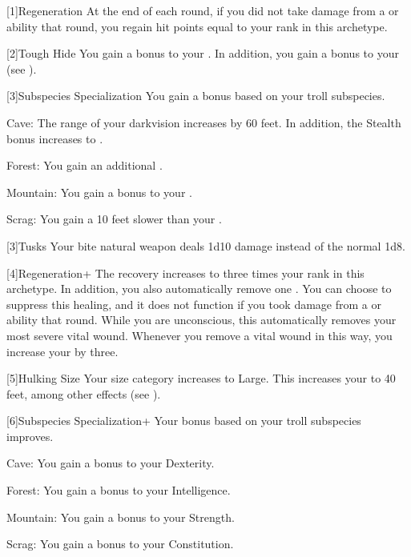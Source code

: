    [1]{Regeneration} At the end of each round, if you did not take damage from a \atAcid or \atFire ability that round, you regain hit points equal to your rank in this archetype.

    [2]{Tough Hide} You gain a  bonus to your .
      In addition, you gain a  bonus to your  (see ).

    [3]{Subspecies Specialization} You gain a bonus based on your troll subspecies.
      \begin{raggeditemize}
        \item Cave: The range of your darkvision increases by 60 feet.
          In addition, the Stealth bonus increases to .
        \item Forest: You gain an additional .
        \item Mountain: You gain a  bonus to your .
        \item Scrag: You gain a  10 feet slower than your .
      \end{raggeditemize}

    [3]{Tusks} Your bite natural weapon deals 1d10 damage instead of the normal 1d8.

    [4]{Regeneration+} The recovery increases to three times your rank in this archetype.
      In addition, you also automatically remove one .
      You can choose to suppress this healing, and it does not function if you took damage from a \atAcid or \atFire ability that round.
      While you are unconscious, this automatically removes your most severe vital wound.
      Whenever you remove a vital wound in this way, you increase your  by three.

    [5]{Hulking Size} Your size category increases to Large.
    This increases your  to 40 feet, among other effects (see ).

    [6]{Subspecies Specialization+} Your bonus based on your troll subspecies improves.
      \begin{raggeditemize}
        \item Cave: You gain a  bonus to your Dexterity.
        \item Forest: You gain a  bonus to your Intelligence.
        \item Mountain: You gain a  bonus to your Strength.
        \item Scrag: You gain a  bonus to your Constitution.
      \end{raggeditemize}

